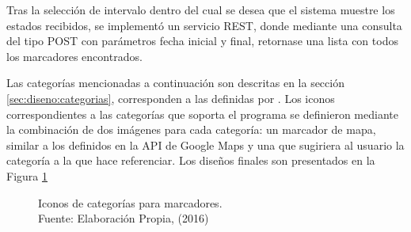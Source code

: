 Tras la selección de intervalo dentro del cual se desea que el sistema muestre los estados recibidos, se implementó un servicio REST, donde mediante una consulta del tipo POST con parámetros fecha inicial y final, retornase una lista con todos los marcadores encontrados.

Las categorías mencionadas a continuación son descritas en la sección \ref{sec:diseno:categorias}, corresponden a las definidas por \cite{PMIProfes}. Los iconos correspondientes a las categorías que soporta el programa se definieron mediante la combinación de dos imágenes para cada categoría: un marcador de mapa, similar a los definidos en la API de Google Maps y una que sugiriera al usuario la categoría a la que hace referenciar. Los diseños finales son presentados en la Figura \ref{fig:categoriasFig}


\begin{figure}[H]
\centering
{}\hfill
{}\hfill
{}\hfill
\vfill
{}\hfill
{}\hfill
{}\hfill
\caption[Categorías para marcadores.]{Iconos de categorías para marcadores.\\Fuente: Elaboración Propia, (2016)}
\label{fig:categoriasFig}
\end{figure}

